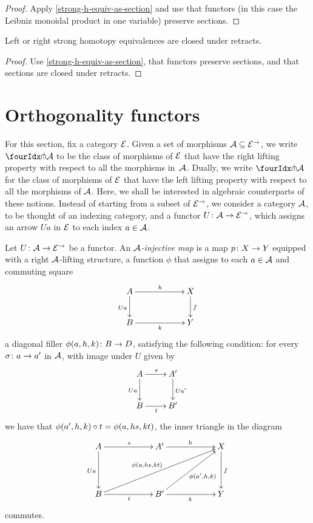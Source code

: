 \documentclass[reqno,10pt,a4paper,oneside]{amsart}
\begin{document}
\begin{proof}
Apply \cref{strong-h-equiv-as-section} and use that functors (in this case the Leibniz monoidal product in one variable) preserve sections.
\end{proof}

\begin{proposition}
\label{strong-h-equiv-closed-under-retract}
Left or right strong homotopy equivalences are closed under retracts.
\end{proposition}

\begin{proof}
Use \cref{strong-h-equiv-as-section},  that functors preserve sections, and that  sections are closed under retracts.
\end{proof}



\section{Orthogonality functors}
\label{sec:ortf}

For this section, fix a category $\catE$. Given a set of morphisms $\cal{A} \subseteq \catE^\to$, we 
write $\liftr{\cal{A}}$ to be the class of morphisms of $\catE$ that have 
the right lifting property with respect to all the morphisms in~$\cal{A}$. Dually, we write $\liftl{\cal{A}}$ for the class of morphisms of $\catE$ that have the left lifting property with respect to all the morphisms of $\cal{A}$. 
Here, we shall be interested in algebraic counterparts of these notions. Instead of starting from a subset of $\catE^\to$, we consider a category $\cal{A}$, to be thought of an indexing category, and a functor $U \co \cal{A} \to \catE^\to$, which assigns an arrow $U a$ in $\catE$ to each index $a \in \cal{A}$.


 \begin{definition} Let $U \co \cal{A} \to \catE^\to$ be a functor. An \emph{$\cal{A}$-injective map}
 is a map $p \co X \to Y$ equipped with a right  $\cal{A}$-lifting structure, \ie 
 a function  $\phi$ that assigns to each $a \in \cal{A}$ and commuting square
\[
\xymatrix@C=2cm{
A \ar[r]^{h}   \ar[d]_{U a} & X \ar[d]^f \\
B \ar[r]_{k} & Y}
\]
a diagonal filler $\phi(a, h, k) \co B \to D$, satisfying the following condition: for every $\sigma \co a \to a'$ in $\cal{A}$, 
with image under $U$ given by
\[
\xymatrix{
A \ar[r]^s \ar[d]_{Ua} & A' \ar[d]^{U a'}  \\
B \ar[r]_{t} & B'}
\]
we have that $\phi(a', h, k) \cc t = \phi(a, hs, kt)$, \ie the inner triangle in the diagram
\[
\xymatrix@C=2cm@R=1.5cm{
A \ar[r]^s \ar[d]_{Ua} & A' \ar[r]^{h}  & X \ar[d]^f   \\
B \ar[r]_{t}  \ar[urr]^{\phi(a, hs, k t) \quad } & B'  \ar[r]_k  \ar[ur]_{\phi(a', h, k)} & Y }
\]
commutes. 
\end{definition}
\end{document}
